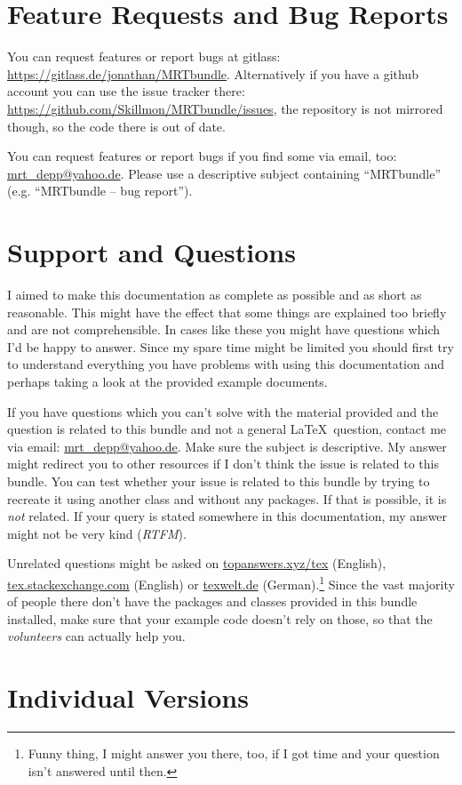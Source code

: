 \section{Feature Requests and Bug Reports}\label{sec:bugs}
You can request features or report bugs at gitlass:
\url{https://gitlass.de/jonathan/MRTbundle}. Alternatively if you have a github
account you can use the issue tracker there:
\url{https://github.com/Skillmon/MRTbundle/issues}, the repository is not
mirrored though, so the code there is out of date.

You can request features or report bugs if you find some via
email, too:
\href{mailto:mrt_depp@yahoo.de?subject=MRTbundle -- bug report}
  {mrt\_depp@yahoo.de}.
Please use a descriptive subject containing ``MRTbundle'' (e.g. ``MRTbundle --
bug report'').

\section{Support and Questions}
I aimed to make this documentation as complete as possible and as short as
reasonable. This might have the effect that some things are explained too
briefly and are not comprehensible. In cases like these you might have questions
which I'd be happy to answer. Since my spare time might be limited you should
first try to understand everything you have problems with using this
documentation and perhaps taking a look at the provided example documents.

If you have questions which you can't solve with the material provided and the
question is related to this bundle and not a general \LaTeX\ question, contact
me via email:
\href{mailto:mrt_depp@yahoo.de?subject=MRTbundle -- support}
  {mrt\_depp@yahoo.de}.
Make sure the subject is descriptive. My answer might redirect you to other
resources if I don't think the issue is related to this bundle. You can test
whether your issue is related to this bundle by trying to recreate it using
another class and without any  packages. If that is possible, it is
\emph{not} related. If your query is stated somewhere in this documentation, my
answer might not be very kind (\!\emph{RTFM}).

Unrelated questions might be asked on \url{topanswers.xyz/tex} (English),
\url{tex.stackexchange.com} (English) or \url{texwelt.de}
(German).\footnote{Funny thing, I might answer you there, too, if I got time and
your question isn't answered until then.} Since the vast majority of people
there don't have the packages and classes provided in this bundle installed,
make sure that your example code doesn't rely on those, so that the
\emph{volunteers} can actually help you.

\section{Individual Versions}
\docIndividualVersions
